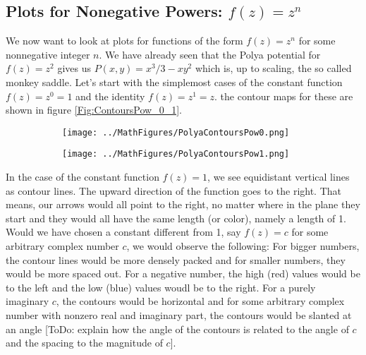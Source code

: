 \documentclass[12pt]{article}
\begin{document}


\subsection{Plots for Nonegative Powers: $f(z) = z^n$}
We now want to look at plots for functions of the form $f(z) = z^n$ for some nonnegative integer $n$. We have already seen that the Polya potential for $f(z) = z^2$ gives us $P(x,y) = x^3/ 3 - x y^2$ which is, up to scaling, the so called monkey saddle. Let's start with the simplemost cases of the constant function$f(z) = z^0 = 1$ and the identity $f(z) = z^1 = z$. the contour maps for these are shown in figure \ref{Fig:ContoursPow_0_1}. 
\begin{figure}[h]
\caption{Polya potential contours of $f(z) = z^0$ and $f(z) = z^1$}	
\label{Fig:ContoursPow_0_1}	
\centering
\begin{subfigure}[b]{0.49\textwidth}
\centering
\texttt{[image: ../MathFigures/PolyaContoursPow0.png]}
\end{subfigure}
\begin{subfigure}[b]{0.49\textwidth}
\centering
\texttt{[image: ../MathFigures/PolyaContoursPow1.png]}
\end{subfigure}
\end{figure}
In the case of the constant function $f(z) = 1$, we see equidistant vertical lines as contour lines. The upward direction of the function goes to the right. That means, our arrows would all point to the right, no matter where in the plane they start and they would all have the same length (or color), namely a length of 1. Would we have chosen a constant different from 1, say $f(z) = c$ for some arbitrary complex number $c$, we would observe the following: For bigger numbers, the contour lines would be more densely packed and for smaller numbers, they would be more spaced out. For a negative number, the high (red) values would be to the left and the low (blue) values woudl be to the right. For a purely imaginary $c$, the contours would be horizontal and for some arbitrary complex number with nonzero real and imaginary part, the contours would be slanted at an angle [ToDo: explain how the angle of the contours is related to the angle of $c$ and the spacing to the magnitude of $c$].
\end{document}
